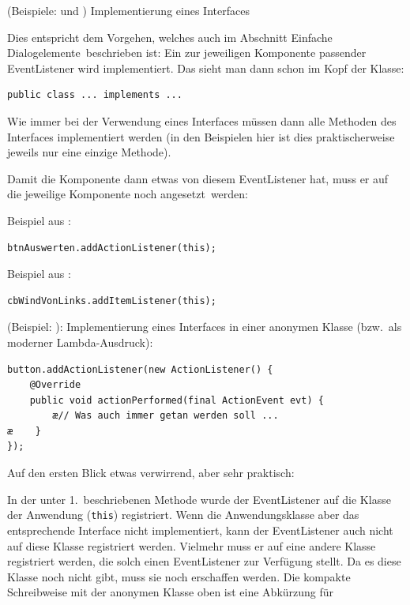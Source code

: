 \begin{compactenum}[1.] 
\item (Beispiele:  und ) Implementierung
eines Interfaces

Dies entspricht dem Vorgehen, welches auch im Abschnitt
\glqq Einfache Dialogelemente\grqq\ beschrieben ist: Ein zur jeweiligen
Komponente passender EventListener wird implementiert. Das sieht man dann
schon im Kopf der Klasse:

\begin{lstlisting}
public class ... implements ... 
\end{lstlisting}

Wie immer bei der Verwendung eines Interfaces müssen dann alle Methoden des 
Interfaces implementiert werden (in den Beispielen hier ist dies
praktischerweise jeweils nur eine einzige Methode).

Damit die Komponente dann etwas von diesem EventListener hat, muss er auf die 
jeweilige Komponente noch \glqq angesetzt\grqq\ werden:

Beispiel aus :  

\begin{lstlisting}
btnAuswerten.addActionListener(this);
\end{lstlisting}

Beispiel aus :

\begin{lstlisting}
cbWindVonLinks.addItemListener(this);
\end{lstlisting}

  
\item (Beispiel: ): Implementierung eines Interfaces
in einer anonymen Klasse (bzw.\ als moderner Lambda-Ausdruck):
   
\begin{lstlisting}
button.addActionListener(new ActionListener() {
    @Override
    public void actionPerformed(final ActionEvent evt) {
        æ// Was auch immer getan werden soll ...
æ    }
});
\end{lstlisting}
   		
   
Auf den ersten Blick etwas verwirrend, aber sehr praktisch:

In der unter 1.\ beschriebenen Methode wurde der EventListener auf die
Klasse der Anwendung (\lstinline|this|) registriert. Wenn die
Anwendungsklasse aber das entsprechende Interface nicht implementiert, kann der
EventListener auch nicht auf diese Klasse registriert werden. Vielmehr muss
er auf eine andere Klasse registriert werden, die solch einen EventListener zur
Verfügung stellt. Da es diese Klasse noch nicht gibt, muss sie noch erschaffen
werden. Die kompakte Schreibweise mit der anonymen Klasse oben ist eine
Abkürzung für


\end{compactenum}
